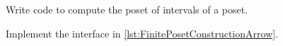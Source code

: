 
\begin{codeexercise}
    Write code to compute the poset of intervals of a poset.

    Implement the interface in \cref{lst:FinitePosetConstructionArrow}.
\end{codeexercise}

